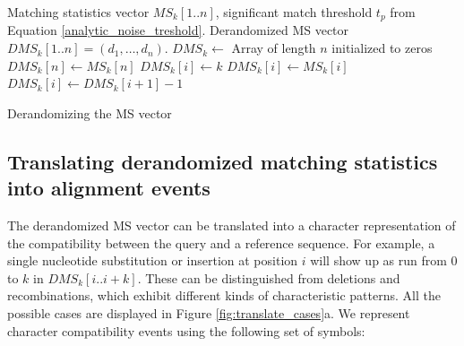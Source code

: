 \documentclass[unnumsec,webpdf,contemporary,large]{oup-authoring-template}%
\theoremstyle{thmstyleone}%
\theoremstyle{thmstyletwo}%
\theoremstyle{thmstylethree}%
\begin{document}

\begin{algorithm}[t]
\begin{algorithmic}[1]
\small
\Require Matching statistics vector $MS_k[1..n]$, significant match threshold $t_p$ from Equation \ref{analytic_noise_treshold}.
\Ensure Derandomized MS vector $DMS_k[1..n] = (d_1, \ldots, d_{n})$.
\State $DMS_k \leftarrow $ Array of length $n$ initialized to zeros
\State $DMS_k[n] \gets MS_k[n]$
\State $DMS_k[i] \gets k$
    \State $DMS_k[i] \gets MS_k[i]$
\Else
    \State $DMS_k[i] \gets DMS_k[i+1]-1$
\EndIf
\EndFor
\caption{\small Derandomizing the MS vector} 
\label{alg:derandomized-MS}
\end{algorithmic}
\end{algorithm}

\subsection{Translating derandomized matching statistics into alignment events}
 




The derandomized MS vector can be translated into a character representation of the compatibility between the query and a reference sequence. For example, a single nucleotide substitution or insertion at position $i$ will show up as run from 0 to $k$ in $DMS_k[i..i+k]$. These can be distinguished from deletions and recombinations, which exhibit different kinds of characteristic patterns. All the possible cases are displayed in Figure \ref{fig:translate_cases}a. We represent character compatibility events using the following set of symbols:
\end{document}
